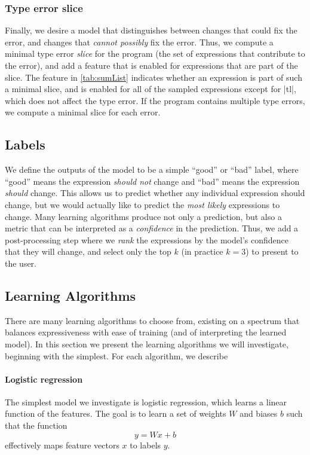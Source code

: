 \subsubsection{Type error slice}
Finally, we desire a model that distinguishes between
changes that could fix the error, and changes that
\emph{cannot possibly} fix the error.
%
Thus, we compute a minimal type error \emph{slice} for the program
(\ie the set of expressions that contribute to the error), and add a
feature that is enabled for expressions that are part of the slice.
%
The \InSlice feature in \autoref{tab:sumList} indicates whether an
expression is part of such a minimal slice, and is enabled for all of
the sampled expressions except for |tl|, which does not affect
the type error.
%
If the program contains multiple type errors, we compute
a minimal slice for each error.

\subsection{Labels}
\label{sec:labels}
We define the outputs of the model to be a simple ``good'' or ``bad''
label, where ``good'' means the expression \emph{should not} change and
``bad'' means the expression \emph{should} change. 
%
This allows us to predict whether any individual expression should
change, but we would actually like to predict the \emph{most likely}
expressions to change.
%
Many learning algorithms produce not only a prediction, but also a
metric that can be interpreted as a \emph{confidence} in the prediction.
%
Thus, we add a post-processing step where we \emph{rank} the expressions
by the model's confidence that they will change, and select only the top
$k$ (in practice $k=3$) to present to the user.

\subsection{Learning Algorithms}
\label{sec:models}
%
There are many learning algorithms to choose from, existing
on a spectrum that balances expressiveness with ease of training (and of
interpreting the learned model).
%
In this section we present the learning algorithms we will investigate,
beginning with the simplest.
%
For each algorithm, we describe 

\paragraph{Logistic regression}
The simplest model we investigate is logistic regression, which learns a
linear function of the features.
%
The goal is to learn a set of weights $W$ and biases $b$ such that the
function
%
$$
y = Wx + b
$$
%
effectively maps feature vectors $x$ to labels $y$.

